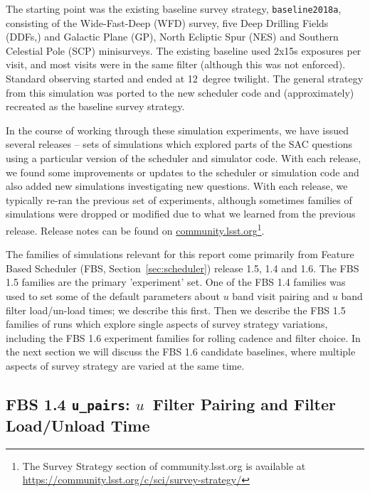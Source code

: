 The starting point was the existing baseline survey strategy, {\tt baseline2018a}, consisting of the Wide-Fast-Deep (WFD) survey, five Deep Drilling Fields (DDFs,) and Galactic Plane (GP), North Ecliptic Spur (NES) and Southern Celestial Pole (SCP) minisurveys. The existing baseline used 2x15s exposures per visit, and most visits were in the same filter (although this was not enforced). Standard observing started and ended at 12~degree twilight. The general strategy from this simulation was ported to the new scheduler code and (approximately) recreated as the baseline survey strategy.

In the course of working through these simulation experiments, we have issued several releases -- sets of simulations which explored parts of the SAC questions using a particular version of the scheduler and simulator code. With each release, we found some improvements or updates to the scheduler or simulation code and also added new simulations investigating new questions. With each release, we typically re-ran the previous set of experiments, although sometimes families of simulations were dropped or modified due to what we learned from the previous release. Release notes can be found on \href{https://community.lsst.org/c/sci/survey-strategy/}{community.lsst.org}\footnote{The Survey Strategy section of community.lsst.org is available at \href{https://community.lsst.org/c/sci/survey-strategy/}{https://community.lsst.org/c/sci/survey-strategy/}}. 

The families of simulations relevant for this report come primarily from Feature Based Scheduler (FBS, Section~\ref{sec:scheduler}) release 1.5, 1.4 and 1.6. The FBS 1.5 families are the primary 'experiment' set. One of the FBS 1.4 families was used to set some of the default parameters about $u$ band visit pairing and $u$ band filter load/un-load times; we describe this first. Then we describe the FBS 1.5 families of runs which explore single aspects of survey strategy variations, including the FBS 1.6 experiment families for rolling cadence and filter choice. In the next section we will discuss the FBS 1.6 candidate baselines, where multiple aspects of survey strategy are varied at the same time.


\subsection{FBS 1.4 {\tt u\_pairs}:  $u$\ Filter Pairing and Filter Load/Unload Time}\label{ss:u_pairs}

